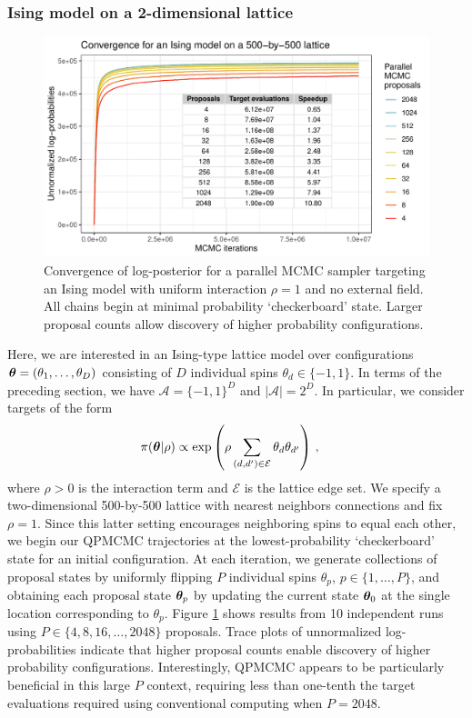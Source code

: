 \documentclass[12pt]{article} %
\begin{document}
\subsubsection{Ising model on a 2-dimensional lattice}\label{sec:ising}

 \begin{figure}[!t]
	\centering
	\includegraphics[width=0.7\linewidth]{Ising2dFig.pdf}
	\caption{Convergence of log-posterior for a parallel MCMC sampler targeting an Ising model with uniform interaction $\rho=1$ and no external field. All chains begin at minimal probability `checkerboard' state. Larger proposal counts allow discovery of higher probability configurations.}\label{fig:ising2d}
\end{figure}

Here, we are interested in an Ising-type lattice model over configurations $\boldsymbol{\theta}=(\theta_1,\dots,\theta_D)$ consisting of $D$ individual spins $\theta_d \in \{-1,1\}$. In terms of the preceding section, we have $\mathcal{A}=\{-1,1\}^D$ and $|\mathcal{A}|=2^D$. In particular, we consider targets of the form
\begin{align}\label{eq:ising}
	\pi (\boldsymbol{\theta} | \rho) &\propto \exp \left( \rho \sum_{(d,d')\in \mathcal{E}} \theta_d \theta_{d'} \right)  \, ,
\end{align}
where $\rho>0$ is the interaction term and $\mathcal{E}$ is the lattice edge set.  We specify a two-dimensional 500-by-500 lattice with nearest neighbors connections and fix $\rho=1$.  Since this latter setting encourages neighboring spins to equal each other, we begin our QPMCMC trajectories at the lowest-probability `checkerboard' state for an initial configuration.  At each iteration, we generate collections of proposal states by uniformly flipping $P$ individual spins $\theta_p$, $p \in \{1,\dots,P\}$, and obtaining each proposal state $\boldsymbol{\theta}_p$ by updating the current state $\boldsymbol{\theta}_0$ at the single location corresponding to $\theta_p$. Figure \ref{fig:ising2d} shows results from 10 independent runs using $P\in \{4, 8, 16, \dots, 2048\}$ proposals.  Trace plots of unnormalized log-probabilities indicate that higher proposal counts enable discovery of higher probability configurations.  Interestingly, QPMCMC appears to be particularly beneficial in this large $P$ context, requiring less than one-tenth the target evaluations required using conventional computing when $P=2048$.  
\end{document}
